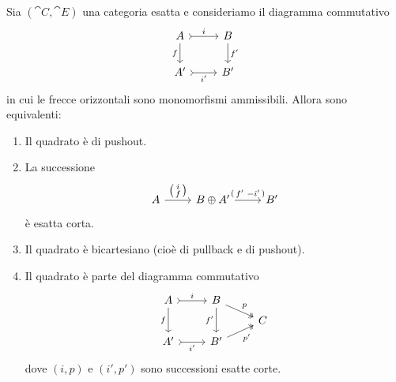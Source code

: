 
\begin{proposition}\label{proposition:pushout-exact-bicart}
  Sia \((\cat C, \cat E)\) una categoria esatta e consideriamo il
  diagramma commutativo
  \[
    \begin{tikzcd}
      A \ar["{f}", d, swap] \ar["{i}", rightarrowtail, r] & B \ar["{f'}", d] \\
      A' \ar["{i'}", rightarrowtail, r, swap] & B'
    \end{tikzcd}
  \]
  in cui le frecce orizzontali sono monomorfismi ammissibili. Allora
  sono equivalenti:
  \begin{enumerate}[leftmargin=*, label=(\roman*), ref=(\roman*)]
  \item\label{item:1} Il quadrato è di pushout.
  \item\label{item:2} La successione
    \[
      \begin{tikzcd}[ampersand replacement=\&]
        A \ar["{\begin{psmallmatrix} i \\ f \end{psmallmatrix}}", r] \&
        B \oplus A' \ar["{\begin{psmallmatrix} f' &
            -i' \end{psmallmatrix}}", r] \& B'
      \end{tikzcd}
    \]
    è esatta corta.
  \item\label{item:3} Il quadrato è bicartesiano (cioè di pullback e di
    pushout).
  \item\label{item:4} Il quadrato è parte del diagramma commutativo
    \[
      \begin{tikzcd}[row sep=tiny]
        A \ar["{f}", dd, swap] \ar["{i}", rightarrowtail, r] & B
        \ar["{f'}", dd, swap]
        \ar["{p}", twoheadrightarrow, dr] \\
        & & C \\
        A' \ar["{i'}", rightarrowtail, r, swap] & B' \ar["{p'}",
        twoheadrightarrow, ur, swap]
      \end{tikzcd}
    \]
    dove \((i, p)\) e \((i', p')\) sono successioni esatte corte.
  \end{enumerate}
\end{proposition}

